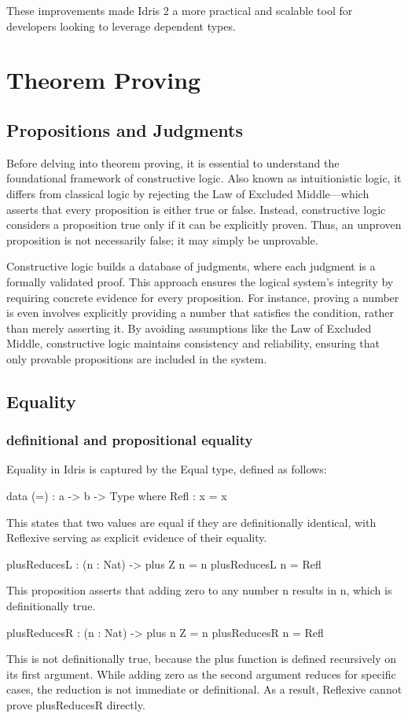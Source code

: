 \documentclass[]{rptuseminar}
\begin{document}
These improvements made Idris 2 a more practical and scalable tool for developers looking to leverage dependent types.
  

\section{Theorem Proving}
\label{sec:Propositions and judgments}
\subsection{Propositions and Judgments}
Before delving into theorem proving, it is essential to understand the foundational framework of constructive logic. Also known as intuitionistic logic, it differs from classical logic by rejecting the Law of Excluded Middle—which asserts that every proposition is either true or false. Instead, constructive logic considers a proposition true only if it can be explicitly proven. Thus, an unproven proposition is not necessarily false; it may simply be unprovable.

Constructive logic builds a database of judgments, where each judgment is a formally validated proof. This approach ensures the logical system’s integrity by requiring concrete evidence for every proposition. For instance, proving a number is even involves explicitly providing a number that satisfies the condition, rather than merely asserting it. By avoiding assumptions like the Law of Excluded Middle, constructive logic maintains consistency and reliability, ensuring that only provable propositions are included in the system.
\subsection{Equality}
\label{sec:Equality}
\subsubsection{definitional and propositional equality}
Equality in Idris is captured by the Equal type, defined as follows:
\begin{idris}
   data (=) : a -> b -> Type where  
   Refl : x = x
\end{idris}
This states that two values are equal if they are definitionally identical, with Reflexive serving as explicit evidence of their equality.

\begin{idris}
    plusReducesL : (n : Nat) -> plus Z n = n
    plusReducesL n = Refl
\end{idris}
This proposition asserts that adding zero to any number n results in n, which is definitionally true.
\begin{idris}
    plusReducesR : (n : Nat) -> plus n Z = n
    plusReducesR n = Refl
\end{idris}
This is not definitionally true, because the plus function is defined recursively on its first argument. While adding zero as the second argument reduces for specific cases, the reduction is not immediate or definitional. As a result, Reflexive cannot prove plusReducesR directly.
\end{document}

